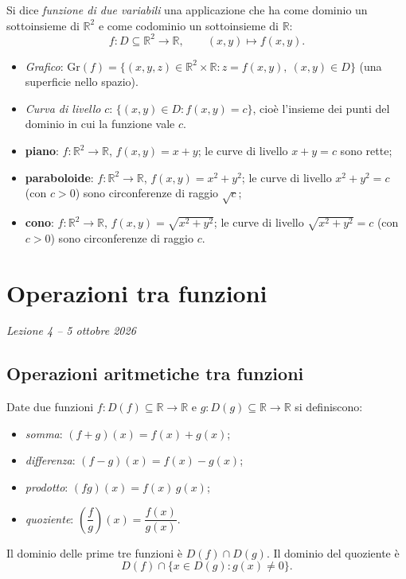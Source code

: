 \documentclass[11pt,a4paper]{article}
\begin{document}
\begin{definizione}
Si dice \emph{funzione di due variabili} una applicazione che ha come dominio un sottoinsieme di $\mathbb{R}^2$ e come codominio un sottoinsieme di $\mathbb{R}$:
\[
f : D \subseteq \mathbb{R}^2 \to \mathbb{R}, \qquad (x, y) \mapsto f(x, y).
\]
\end{definizione}

\begin{itemize}
    \item \emph{Grafico}: $\mathrm{Gr}(f) = \{(x, y, z) \in \mathbb{R}^2 \times \mathbb{R} : z = f(x, y),\ (x, y) \in D\}$ (una superficie nello spazio).
    \item \emph{Curva di livello} $c$: $\{(x, y) \in D : f(x, y) = c\}$, cioè l'insieme dei punti del dominio in cui la funzione vale $c$.
\end{itemize}

\begin{esempio}
\leavevmode
\begin{itemize}
    \item \textbf{piano}: $f : \mathbb{R}^2 \to \mathbb{R}$, $f(x, y) = x + y$; le curve di livello $x + y = c$ sono rette;
    \item \textbf{paraboloide}: $f : \mathbb{R}^2 \to \mathbb{R}$, $f(x, y) = x^2 + y^2$; le curve di livello $x^2 + y^2 = c$ (con $c > 0$) sono circonferenze di raggio $\sqrt c$;
    \item \textbf{cono}: $f : \mathbb{R}^2 \to \mathbb{R}$, $f(x, y) = \sqrt{x^2 + y^2}$; le curve di livello $\sqrt{x^2 + y^2} = c$ (con $c > 0$) sono circonferenze di raggio $c$.
\end{itemize}
\end{esempio}

\section[Operazioni tra funzioni (Lezione 4 -- 5 ottobre 2026)]{Operazioni tra funzioni}
\noindent\emph{Lezione 4 -- 5 ottobre 2026}
\subsection{Operazioni aritmetiche tra funzioni}

Date due funzioni $f : D(f) \subseteq \mathbb{R} \to \mathbb{R}$ e $g : D(g) \subseteq \mathbb{R} \to \mathbb{R}$ si definiscono:
\begin{itemize}
    \item \emph{somma}: $(f + g)(x) = f(x) + g(x)$;
    \item \emph{differenza}: $(f - g)(x) = f(x) - g(x)$;
    \item \emph{prodotto}: $(fg)(x) = f(x)\,g(x)$;
    \item \emph{quoziente}: $\left(\dfrac{f}{g}\right)(x) = \dfrac{f(x)}{g(x)}$.
\end{itemize}
Il dominio delle prime tre funzioni è $D(f) \cap D(g)$. Il dominio del quoziente è
\[
D(f) \cap \{x \in D(g) : g(x) \neq 0\}.
\]
\end{document}
